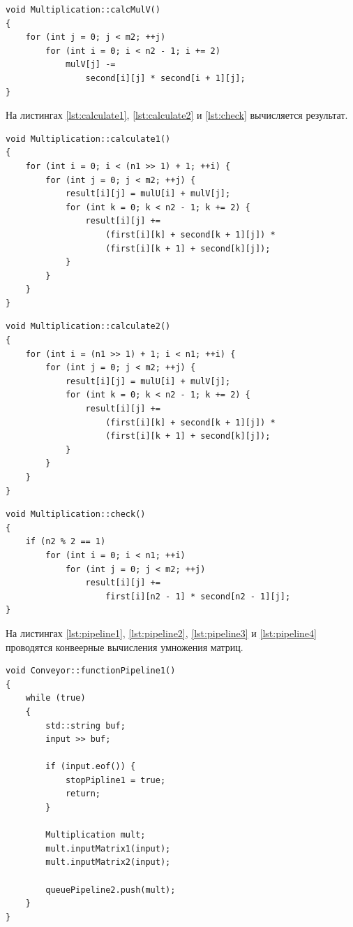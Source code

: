 \documentclass[a4paper,12pt]{article}
\begin{document}
\begin{lstlisting}[caption=Подсчет { \ttfamily mulV },label=lst:mulV]
void Multiplication::calcMulV()
{
    for (int j = 0; j < m2; ++j)
        for (int i = 0; i < n2 - 1; i += 2)
            mulV[j] -=
                second[i][j] * second[i + 1][j];
}
\end{lstlisting}

На листингах \ref{lst:calculate1}, \ref{lst:calculate2} и \ref{lst:check} вычисляется
результат.

\begin{lstlisting}[caption=Подсчет первой половины результата,label=lst:calculate1]
void Multiplication::calculate1()
{
    for (int i = 0; i < (n1 >> 1) + 1; ++i) {
        for (int j = 0; j < m2; ++j) {
            result[i][j] = mulU[i] + mulV[j];
            for (int k = 0; k < n2 - 1; k += 2) {
                result[i][j] +=
                    (first[i][k] + second[k + 1][j]) *
                    (first[i][k + 1] + second[k][j]);
            }
        }
    }
}
\end{lstlisting}

\begin{lstlisting}[caption=Подсчет второй половины результата,label=lst:calculate2]
void Multiplication::calculate2()
{
    for (int i = (n1 >> 1) + 1; i < n1; ++i) {
        for (int j = 0; j < m2; ++j) {
            result[i][j] = mulU[i] + mulV[j];
            for (int k = 0; k < n2 - 1; k += 2) {
                result[i][j] +=
                    (first[i][k] + second[k + 1][j]) *
                    (first[i][k + 1] + second[k][j]);
            }
        }
    }
}
\end{lstlisting}

\begin{lstlisting}[caption=Проверка на нечетность и вычисление если необходимо,label=lst:check]
void Multiplication::check()
{
    if (n2 % 2 == 1)
        for (int i = 0; i < n1; ++i)
            for (int j = 0; j < m2; ++j)
                result[i][j] +=
                    first[i][n2 - 1] * second[n2 - 1][j];
}
\end{lstlisting}

На листингах \ref{lst:pipeline1}, \ref{lst:pipeline2}, \ref{lst:pipeline3} и
\ref{lst:pipeline4} проводятся конвеерные вычисления умножения матриц.

\begin{lstlisting}[caption=Первый конвейер,label=lst:pipeline1]
void Conveyor::functionPipeline1()
{
    while (true)
    {
        std::string buf;
        input >> buf;

        if (input.eof()) {
            stopPipline1 = true;
            return;
        }

        Multiplication mult;
        mult.inputMatrix1(input);
        mult.inputMatrix2(input);

        queuePipeline2.push(mult);
    }
}
\end{lstlisting}
\end{document}

